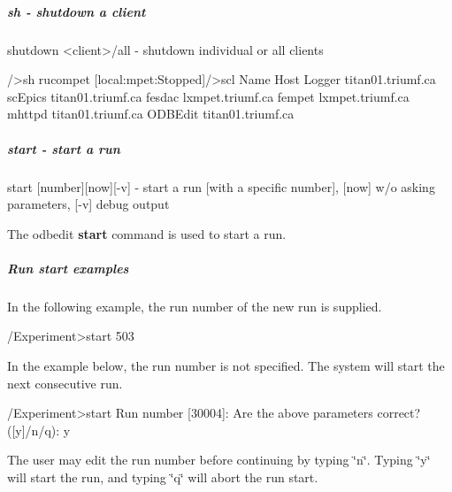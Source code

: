 \hypertarget{RC_odbedit_examples_RC_odbedit_sh}{}\subparagraph{sh -\/ shutdown a client}\label{RC_odbedit_examples_RC_odbedit_sh}

\begin{DoxyCode}
shutdown <client>/all   - shutdown individual or all clients
\end{DoxyCode}
 \par
 
\begin{DoxyCode}
/>sh rucompet
[local:mpet:Stopped]/>scl
Name                Host
Logger              titan01.triumf.ca
scEpics             titan01.triumf.ca
fesdac              lxmpet.triumf.ca
fempet              lxmpet.triumf.ca
mhttpd              titan01.triumf.ca
ODBEdit             titan01.triumf.ca
\end{DoxyCode}


\label{RC_odbedit_examples_idx_run_start}
\hypertarget{RC_odbedit_examples_idx_run_start}{}
 

\hypertarget{RC_odbedit_examples_RC_odbedit_start}{}\subparagraph{start -\/ start a run}\label{RC_odbedit_examples_RC_odbedit_start}

\begin{DoxyCode}
start [number][now][-v] - start a run [with a specific number],
                          [now] w/o asking parameters, [-v] debug output
\end{DoxyCode}
 \par


The odbedit {\bfseries start} command is used to start a run.

\par
 \hypertarget{RC_odbedit_examples_RC_EOS_example1}{}\subparagraph{Run start examples}\label{RC_odbedit_examples_RC_EOS_example1}
In the following example, the run number of the new run is supplied. 
\begin{DoxyCode}
/Experiment>start 503
\end{DoxyCode}
 \par


In the example below, the run number is not specified. The system will start the next consecutive run. 
\begin{DoxyCode}
/Experiment>start
Run number [30004]: 
Are the above parameters correct? ([y]/n/q): y
\end{DoxyCode}
 The user may edit the run number before continuing by typing \char`\"{}n\char`\"{}. Typing \char`\"{}y\char`\"{} will start the run, and typing \char`\"{}q\char`\"{} will abort the run start. \par


